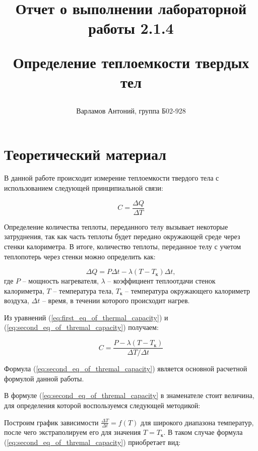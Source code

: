 \documentclass[12pt,a4paper]{article}
\title{
Отчет о выполнении лабораторной работы 2.1.4 

Определение теплоемкости твердых тел
}
\author{Варламов Антоний, группа Б02-928}
\begin{document}
\maketitle

\newpage

\section{Теоретический материал}

	В данной работе происходит измерение теплоемкости твердого тела с использованием следующей принципиальной связи:
	
	\begin{equation}
		C = \frac{\Delta Q}{\Delta T}
		\label{eq:first_eq_of_thermal_capacity}
	\end{equation}
	
	Определение количества теплоты, переданного телу вызывает некоторые затруднения, так как часть теплоты будет передано окружающей среде через стенки калориметра. В итоге, количество теплоты, переданное телу с учетом теплопотерь через стенки можно определить как:
	
	\begin{equation}
		\Delta Q = P\Delta t - \lambda \left( T - T_{\text{к}} \right) \Delta t,
		\label{eq:termal_with_heat_lossing}
	\end{equation}
	 где $P$ -- мощность нагревателя, $\lambda$ -- коэффициент теплоотдачи стенок калориметра, $T$ -- температура тела, $T_{\text{к}}$ -- температура окружающего калориметр воздуха, $\Delta t$ -- время, в течении которого происходит нагрев.
	 
	 Из уравнений (\ref{eq:first_eq_of_thermal_capacity}) и (\ref{eq:second_eq_of_thremal_capacity}) получаем:
	 
	 \begin{equation}
	 	C = \frac{P - \lambda \left(T - T_{\text{к}} \right) }{\Delta T /\Delta t}
	 	\label{eq:second_eq_of_thremal_capacity}
	 \end{equation}
	 
	Формула (\ref{eq:second_eq_of_thremal_capacity}) является основной расчетной формулой данной работы.
	
	В формуле (\ref{eq:second_eq_of_thremal_capacity} в знаменателе стоит величина, для определения которой воспользуемся следующей методикой:
	
	Построим график зависимости $\frac{\Delta T}{\Delta t} = f \left( T \right)$ для широкого диапазона температур, после чего экстраполируем его для значения $T = T_{\text{к}}$. В таком случае формула (\ref{eq:second_eq_of_thremal_capacity}) приобретает вид:
	
\end{document}
